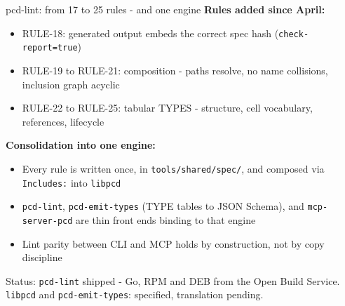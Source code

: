 \documentclass[
  10pt,
  ignorenonframetext,
  aspectratio=169,
  10pt]{beamer}
\providecommand{\tightlist}{%
  \setlength{\itemsep}{0pt}\setlength{\parskip}{0pt}}
\begin{document}
\begin{frame}[fragile]{pcd-lint: from 17 to 25 rules - and one engine}
\protect\hypertarget{pcd-lint-from-17-to-25-rules---and-one-engine}{}
\textbf{Rules added since April:}

\begin{itemize}
\tightlist
\item
  RULE-18: generated output embeds the correct spec hash
  (\texttt{check-report=true})
\item
  RULE-19 to RULE-21: composition - paths resolve, no name collisions,
  inclusion graph acyclic
\item
  RULE-22 to RULE-25: tabular TYPES - structure, cell vocabulary,
  references, lifecycle
\end{itemize}

\bigskip

\textbf{Consolidation into one engine:}

\begin{itemize}
\tightlist
\item
  Every rule is written once, in \texttt{tools/shared/spec/}, and
  composed via \texttt{Includes:} into \texttt{libpcd}
\item
  \texttt{pcd-lint}, \texttt{pcd-emit-types} (TYPE tables to JSON
  Schema), and \texttt{mcp-server-pcd} are thin front ends binding to
  that engine
\item
  Lint parity between CLI and MCP holds by construction, not by copy
  discipline
\end{itemize}

\bigskip

Status: \texttt{pcd-lint} shipped - Go, RPM and DEB from the Open Build
Service.\\
\texttt{libpcd} and \texttt{pcd-emit-types}: specified, translation
pending.
\end{frame}
\end{document}
